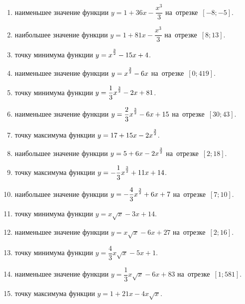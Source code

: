 \documentclass[a4paper,10pt]{article}
\begin{document}
\begin{enumerate}
\item {} наименьшее значение функции $y=1 +36x-\dfrac{x^3}{3}$ на~отрезке~$\left[-8;-5\right]$.

\item {} наибольшее значение функции $y=1 +81x-\dfrac{x^3}{3}$ на~отрезке~$\left[8;13\right]$.

\item {} точку минимума функции $y=x\strut^{\frac{3}{2}} -15x+4$.

\item {} наименьшее значение функции $y=x\strut^{\frac{3}{2}} -6x$ на~отрезке~$\left[0;419\right]$.

\item {} точку минимума функции $y=\dfrac{1}{3}x\strut^{\frac{3}{2}} -2x+81$.

\item {} наименьшее значение функции $y=\dfrac{2}{3}x\strut^{\frac{3}{2}} -6x+15$ на~отрезке~$\left[30;43\right]$.

\item {} точку максимума функции $y=17+15x-2x\strut^{\frac{3}{2}}$.

\item {} наибольшее значение функции $y=5+6x-2x\strut^{\frac{3}{2}}$ на~отрезке~$\left[2;18\right]$.

\item {} точку максимума функции $y=-\dfrac{1}{3}x\strut^{\frac{3}{2}} +11x+14$.

\item {} наибольшее значение функции $y=-\dfrac{4}{3}x\strut^{\frac{3}{2}} +6x+7$ на~отрезке~$\left[7;10\right]$.

\item {} точку минимума функции $y=x\sqrt{x} -3x+14$.

\item {} наименьшее значение функции $y=x\sqrt{x} -6x+27$ на~отрезке~$\left[2;16\right]$.

\item {} точку минимума функции $y=\dfrac{4}{3}x\sqrt{x} -5x+1$.

\item {} наименьшее значение функции $y=\dfrac{1}{3}x\sqrt{x} -6x+83$ на~отрезке~$\left[1;581\right]$.

\item {} точку максимума функции $y=1+21x -4x\sqrt{x}$.


\end{enumerate}
\end{document}
